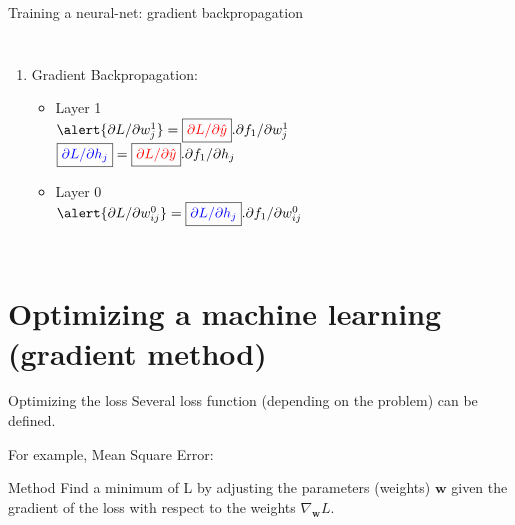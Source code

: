 \documentclass[handout, 10pt]{beamer}
\begin{document}
\begin{frame}{Training a neural-net: gradient backpropagation}
\begin{columns}
\begin{enumerate}[<+->]
    \item \alert{Gradient Backpropagation:}
    \begin{itemize}
   \item Layer 1\\
   $\alert{\partial L/\partial w_j^1} = 
   \boxed{\color{red}\partial L/\partial \hat{y}}.
   \partial f_1 / \partial w^1_j$\\
   
   $ \boxed{\color{blue}\partial L/\partial h_j} = 
    \boxed{\color{red}\partial L/\partial \hat{y}}. 
   \partial f_1 / \partial h_j$
   
   \item Layer 0\\
   $\alert{\partial L/\partial w^0_{ij}}=
  \boxed{\color{blue}\partial L/\partial h_j}
   .\partial f_1 / \partial w^0_{ij}  $
    
    \end{itemize}
\end{enumerate}

\end{columns}

\end{frame}

\section{Optimizing a machine learning (gradient method)}

\begin{frame}{Optimizing the loss}
    Several loss function (depending on the problem) can be defined.
    
    For example, Mean Square Error:
    
    \begin{alertblock}{Method}
    Find a minimum of L by adjusting the parameters (weights) $\mathbf{w}$ given the gradient of the loss with respect to the weights $\nabla_\mathbf{w}L$.
    \end{alertblock}
\end{frame}
\end{document}
